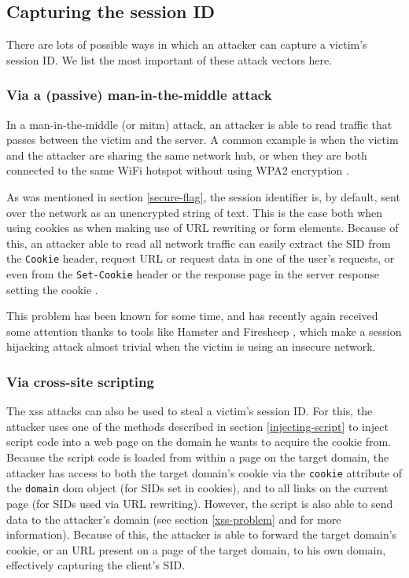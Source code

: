 \subsection{Capturing the session ID}\label{capturing}

There are lots of possible ways in which an attacker can capture a victim's session ID. We list the most important of these \glspl{attack vector} here.

\subsubsection{Via a (passive) man-in-the-middle attack}

In a man-in-the-middle (or \gls{mitm}) attack, an attacker is able to read traffic that passes between the victim and the server. A common example is when the victim and the attacker are sharing the same network hub, or when they are both connected to the same WiFi hotspot without using WPA2 encryption \cite{Arana2006}.

As was mentioned in section \ref{secure-flag}, the session identifier is, by default, sent over the network as an unencrypted string of text. This is the case both when using cookies as when making use of URL rewriting or form elements. Because of this, an attacker able to read all network traffic can easily extract the SID from the \texttt{Cookie} header, request URL or request data in one of the user's requests, or even from the \texttt{Set-Cookie} header or the response page in the server response setting the cookie \cite{Adida2008}.

This problem has been known for some time, and has recently again received some attention thanks to tools like Hamster \cite{Graham2007} and Firesheep \cite{Butler2010}, which make a session hijacking attack almost trivial when the victim is using an insecure network.

\subsubsection{Via cross-site scripting}

The \gls{xss} attacks can also be used to steal a victim's session ID. For this, the attacker uses one of the methods described in section \ref{injecting-script} to inject script code into a web page on the domain he wants to acquire the cookie from. Because the script code is loaded from within a page on the target domain, the attacker has access to both the target domain's cookie via the \texttt{cookie} attribute of the \texttt{domain} \gls{dom} object (for SIDs set in cookies), and to all links on the current page (for SIDs used via URL rewriting). However, the script is also able to send data to the attacker's domain (see section \ref{xss-problem} and \cite{Klein2002} for more information). Because of this, the attacker is able to forward the target domain's cookie, or an URL present on a page of the target domain, to his own domain, effectively capturing the client's SID.

